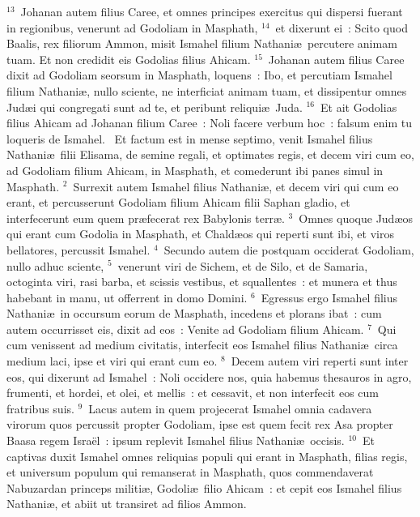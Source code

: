 ${}^{13}$~Johanan autem filius Caree, et omnes principes exercitus qui dispersi fuerant in regionibus, venerunt ad Godoliam in Masphath,
${}^{14}$~et dixerunt ei~: Scito quod Baalis, rex filiorum Ammon, misit Ismahel filium Nathani\ae\ percutere animam tuam. Et non credidit eis Godolias filius Ahicam.
${}^{15}$~Johanan autem filius Caree dixit ad Godoliam seorsum in Masphath, loquens~: Ibo, et percutiam Ismahel filium Nathani\ae , nullo sciente, ne interficiat animam tuam, et dissipentur omnes Jud\ae i qui congregati sunt ad te, et peribunt reliqui\ae\ Juda.
${}^{16}$~Et ait Godolias filius Ahicam ad Johanan filium Caree~: Noli facere verbum hoc~: falsum enim tu loqueris de Ismahel.
~Et factum est in mense septimo, venit Ismahel filius Nathani\ae\ filii Elisama, de semine regali, et optimates regis, et decem viri cum eo, ad Godoliam filium Ahicam, in Masphath, et comederunt ibi panes simul in Masphath.
${}^{2}$~Surrexit autem Ismahel filius Nathani\ae , et decem viri qui cum eo erant, et percusserunt Godoliam filium Ahicam filii Saphan gladio, et interfecerunt eum quem pr\ae fecerat rex Babylonis terr\ae .
${}^{3}$~Omnes quoque Jud\ae os qui erant cum Godolia in Masphath, et Chald\ae os qui reperti sunt ibi, et viros bellatores, percussit Ismahel.
${}^{4}$~Secundo autem die postquam occiderat Godoliam, nullo adhuc sciente,
${}^{5}$~venerunt viri de Sichem, et de Silo, et de Samaria, octoginta viri, rasi barba, et scissis vestibus, et squallentes~: et munera et thus habebant in manu, ut offerrent in domo Domini.
${}^{6}$~Egressus ergo Ismahel filius Nathani\ae\ in occursum eorum de Masphath, incedens et plorans ibat~: cum autem occurrisset eis, dixit ad eos~: Venite ad Godoliam filium Ahicam.
${}^{7}$~Qui cum venissent ad medium civitatis, interfecit eos Ismahel filius Nathani\ae\ circa medium laci, ipse et viri qui erant cum eo.
${}^{8}$~Decem autem viri reperti sunt inter eos, qui dixerunt ad Ismahel~: Noli occidere nos, quia habemus thesauros in agro, frumenti, et hordei, et olei, et mellis~: et cessavit, et non interfecit eos cum fratribus suis.
${}^{9}$~Lacus autem in quem projecerat Ismahel omnia cadavera virorum quos percussit propter Godoliam, ipse est quem fecit rex Asa propter Baasa regem Isra\"el~: ipsum replevit Ismahel filius Nathani\ae\ occisis.
${}^{10}$~Et captivas duxit Ismahel omnes reliquias populi qui erant in Masphath, filias regis, et universum populum qui remanserat in Masphath, quos commendaverat Nabuzardan princeps militi\ae , Godoli\ae\ filio Ahicam~: et cepit eos Ismahel filius Nathani\ae , et abiit ut transiret ad filios Ammon.


